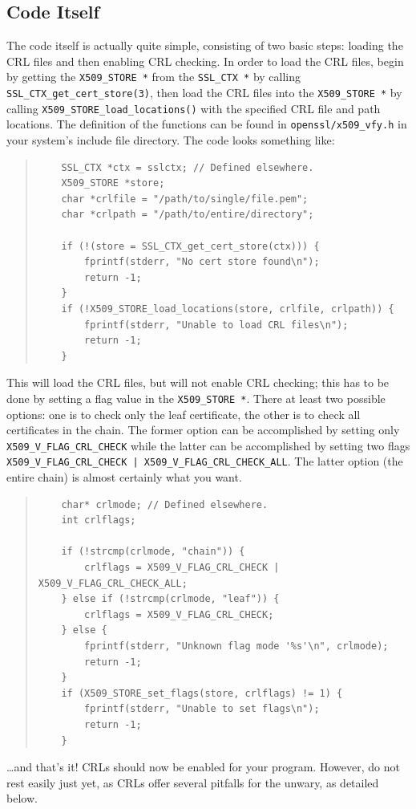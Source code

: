\documentclass{article}
\begin{document}
\subsection{Code Itself}
The code itself is actually quite simple, consisting of two basic steps: loading the CRL files and then enabling CRL checking.  In order to load the CRL files, begin by getting the \texttt{X509_STORE *} from the \texttt{SSL_CTX *} by calling \texttt{SSL_CTX_get_cert_store(3)}, then load the CRL files into the \texttt{X509_STORE *} by calling \texttt{X509_STORE_load_locations()} with the specified CRL file and path locations.  The definition of the functions can be found in \texttt{openssl/x509_vfy.h} in your system's include file directory.  The code looks something like:
\begin{quote}
\begin{verbatim}
	SSL_CTX *ctx = sslctx; // Defined elsewhere.
	X509_STORE *store;
	char *crlfile = "/path/to/single/file.pem";
	char *crlpath = "/path/to/entire/directory";

	if (!(store = SSL_CTX_get_cert_store(ctx))) {
		fprintf(stderr, "No cert store found\n");
		return -1;
	}
	if (!X509_STORE_load_locations(store, crlfile, crlpath)) {
		fprintf(stderr, "Unable to load CRL files\n");
		return -1;
	}
\end{verbatim}
\end{quote}
This will load the CRL files, but will not enable CRL checking; this has to be done by setting a flag value in the \texttt{X509_STORE *}.  There at least two possible options: one is to check only the leaf certificate, the other is to check all certificates in the chain.  The former option can be accomplished by setting only \texttt{X509_V_FLAG_CRL_CHECK} while the latter can be accomplished by setting two flags \texttt{X509_V_FLAG_CRL_CHECK | X509_V_FLAG_CRL_CHECK_ALL}.  The latter option (the entire chain) is almost certainly what you want.
\begin{quote}
\begin{verbatim}
	char* crlmode; // Defined elsewhere.
	int crlflags;

	if (!strcmp(crlmode, "chain")) {
		crlflags = X509_V_FLAG_CRL_CHECK | X509_V_FLAG_CRL_CHECK_ALL;
	} else if (!strcmp(crlmode, "leaf")) {
		crlflags = X509_V_FLAG_CRL_CHECK;
	} else {
		fprintf(stderr, "Unknown flag mode '%s'\n", crlmode);
		return -1;
	}
	if (X509_STORE_set_flags(store, crlflags) != 1) {
		fprintf(stderr, "Unable to set flags\n");
		return -1;
	}
\end{verbatim}
\end{quote}
\ldots and that's it!  CRLs should now be enabled for your program.  However, do not rest easily just yet, as CRLs offer several pitfalls for the unwary, as detailed below.
\end{document}
